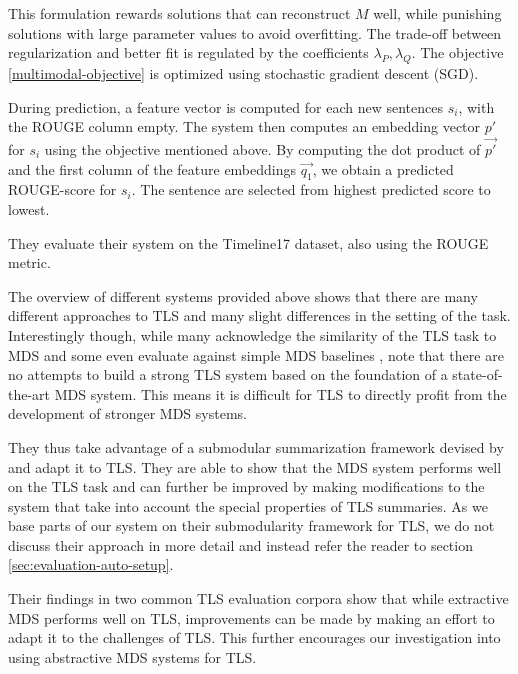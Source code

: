 \documentclass[a4paper,BCOR=10mm]{report}
\numberwithin{lemma}{chapter}
\numberwithin{definition}{chapter}
\begin{document}
This formulation rewards solutions that can reconstruct $M$ well, while punishing solutions with large parameter values to avoid overfitting. The trade-off between regularization and better fit is regulated by the coefficients $\lambda_P, \lambda_Q$.
The objective \ref{multimodal-objective} is optimized using stochastic gradient descent (SGD).

During prediction, a feature vector is computed for each new sentences $s_i$, with the ROUGE column empty. The system then computes an embedding vector $p'$ for $s_i$ using the objective mentioned above. By computing the dot product of $\vec{p'}$ and the first column of the feature embeddings $\vec{q_1}$, we obtain a predicted ROUGE-score for $s_i$.
The sentence are selected from highest predicted score to lowest.

They evaluate their system on the Timeline17 dataset, also using the ROUGE metric.


The overview of different systems provided above shows that there are many different approaches to TLS and many slight differences in the setting of the task. Interestingly though, while many acknowledge the similarity of the TLS task to MDS \citep{yan-trans, headline} and some even evaluate against simple MDS baselines \citep{yan-trans}, \citet{markert} note that there are no attempts to build a strong TLS system based on the foundation of a state-of-the-art MDS system. This means it is difficult for TLS to directly profit from the development of stronger MDS systems.

They thus take advantage of a submodular summarization framework devised by \citet{lin+bilmes} and adapt it to TLS.
They are able to show that the MDS system performs well on the TLS task and can further be improved by making modifications to the system that take into account the special properties of TLS summaries.
As we base parts of our system on their submodularity framework for TLS, we do not discuss their approach in more detail and instead refer the reader to section \ref{sec:evaluation-auto-setup}.

Their findings in two common TLS evaluation corpora show that while extractive MDS performs well on TLS, improvements can be made by making an effort to adapt it to the challenges of TLS.
This further encourages our investigation into using abstractive MDS systems for TLS.

\end{document}
